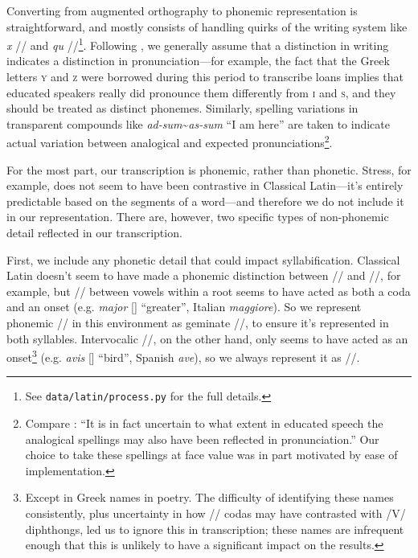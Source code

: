 \documentclass[12pt,twoside]{article}
\newcommand{\ipa}[1]{/\textipa{#1}/}
\newcommand{\ipab}[1]{[\textipa{#1}]}
\begin{document}
Converting from augmented orthography to phonemic representation is straightforward, and mostly consists of handling quirks of the writing system like \emph{x} \ipa{ks} and \emph{qu} \ipa{k\super{w}}\footnote{See \texttt{data/latin/process.py} for the full details.}. Following \citet{allen}, we generally assume that a distinction in writing indicates a distinction in pronunciation---for example, the fact that the Greek letters \textsc{y} and \textsc{z} were borrowed during this period to transcribe loans implies that educated speakers really did pronounce them differently from \textsc{i} and \textsc{s}, and they should be treated as distinct phonemes. Similarly, spelling variations in transparent compounds like \emph{ad-sum}\textasciitilde\emph{as-sum} ``I am here'' are taken to indicate actual variation between analogical and expected pronunciations\footnote{Compare \citet[22]{allen}: ``It is in fact uncertain to what extent in educated speech the analogical spellings may also have been reflected in pronunciation.'' Our choice to take these spellings at face value was in part motivated by ease of implementation.}.

For the most part, our transcription is phonemic, rather than phonetic. Stress, for example, does not seem to have been contrastive in Classical Latin---it's entirely predictable based on the segments of a word---and therefore we do not include it in our representation. There are, however, two specific types of non-phonemic detail reflected in our transcription.

First, we include any phonetic detail that could impact syllabification. Classical Latin doesn't seem to have made a phonemic distinction between \ipa{j} and \ipa{jj}, for example, but \ipa{j} between vowels within a root seems to have acted as both a coda and an onset (e.g. \emph{major} \ipab{maj.jor} ``greater'', Italian \emph{maggiore}). So we represent phonemic \ipa{j} in this environment as geminate \ipa{jj}, to ensure it's represented in both syllables. Intervocalic \ipa{w}, on the other hand, only seems to have acted as an onset\footnote{Except in Greek names in poetry. The difficulty of identifying these names consistently, plus uncertainty in how \ipa{w} codas may have contrasted with /V/ diphthongs, led us to ignore this in transcription; these names are infrequent enough that this is unlikely to have a significant impact on the results.} (e.g. \emph{avis} \ipab{a.wis} ``bird'', Spanish \emph{ave}), so we always represent it as \ipa{w}.
\end{document}
